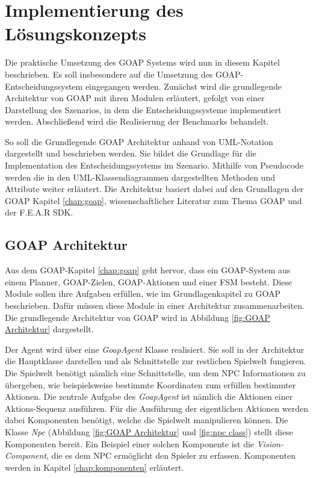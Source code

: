 \chapter{Implementierung des Lösungskonzepts}
\label{chap:implementierung lk}

Die praktische Umsetzung des GOAP Systems wird nun in diesem Kapitel beschrieben. Es soll insbesondere auf die Umsetzung des GOAP-Entscheidungssystem eingegangen werden. Zunächst wird die grundlegende Architektur von GOAP mit ihren Modulen erläutert, gefolgt von einer Darstellung des Szenarios, in dem die Entscheidungssysteme implementiert werden. Abschlie\ss{}end wird die Realisierung der Benchmarks behandelt.

So soll die Grundlegende GOAP Architektur anhand von UML-Notation dargestellt und beschrieben werden. Sie bildet die Grundlage für die Implementation des Entscheidungssystems im Szenario. Mithilfe von Pseudocode werden die in den UML-Klassendiagrammen dargestellten Methoden und Attribute weiter erläutert. Die Architektur basiert dabei auf den Grundlagen der GOAP Kapitel \ref{chap:goap}, wissenschaftlicher Literatur zum Thema GOAP und der F.E.A.R SDK\autocite{}.








\section{GOAP Architektur}
\label{chap:goap architektur}

Aus dem GOAP-Kapitel \ref{chap:goap} geht hervor, dass ein GOAP-System aus einem Planner, GOAP-Zielen, GOAP-Aktionen und einer FSM besteht. Diese Module sollen ihre Aufgaben erfüllen, wie im Grundlagenkapitel zu GOAP beschrieben. Dafür müssen diese Module in einer Architektur zusammenarbeiten. Die grundlegende Architektur von GOAP wird in Abbildung \ref{fig:GOAP Architektur} dargestellt.

Der Agent wird über eine \textit{GoapAgent} Klasse realisiert. Sie soll in der Architektur die Hauptklasse darstellen und als Schnittstelle zur restlichen Spielwelt fungieren. Die Spielwelt benötigt nämlich eine Schnittstelle, um dem NPC Informationen zu übergeben, wie beispielsweise bestimmte Koordinaten zum erfüllen bestimmter Aktionen. Die zentrale Aufgabe des \textit{GoapAgent} ist nämlich die Aktionen einer Aktions-Sequenz ausführen. Für die Ausführung der eigentlichen Aktionen werden dabei Komponenten benötigt, welche die Spielwelt manipulieren können. Die Klasse \textit{Npc} (Abbildung \ref{fig:GOAP Architektur} und \ref{fig:npc class}) stellt diese Komponenten bereit. Ein Beispiel einer solchen Komponente ist die \textit{Vision-Component}, die es dem NPC ermöglicht den Spieler zu erfassen. Komponenten werden in Kapitel \ref{chap:komponenten} erläutert.


